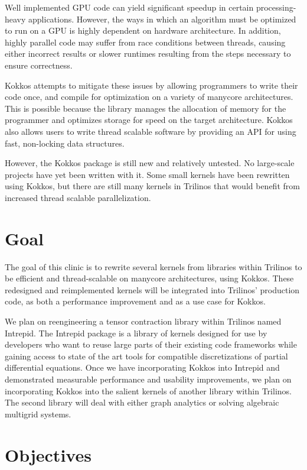 \documentclass[proposal]{hmcclinic}
\begin{document}
Well implemented GPU code can yield significant speedup in certain
processing-heavy applications.  However, the ways in which an algorithm must be optimized 
to run on a GPU is highly dependent on hardware architecture.  In
addition, highly parallel code may suffer from race conditions between threads,
causing either incorrect results or slower runtimes resulting from the steps
necessary to ensure correctness.

Kokkos attempts to mitigate these issues by allowing programmers to
write their code once, and compile for optimization on a variety of
manycore architectures.  This is possible because the library manages the
allocation of memory for the programmer and optimizes storage for speed on
the target architecture. Kokkos also allows users to write thread scalable
software by providing an API for using fast, non-locking data structures. 

However, the Kokkos package is still new and relatively untested.  No
large-scale projects have yet been written with it.  Some small kernels
have been rewritten using Kokkos, but there are still many kernels in Trilinos
that would benefit from increased thread scalable parallelization. 


\section{Goal}

The goal of this clinic is to rewrite several kernels from libraries within Trilinos to be efficient
and thread-scalable on manycore architectures, using Kokkos.  These redesigned
and reimplemented kernels will be integrated into Trilinos' production code, as
both a performance improvement and as a use case for Kokkos.

We plan on reengineering a tensor contraction library within Trilinos named Intrepid. The 
Intrepid package is a library of kernels designed for use by developers who want to 
reuse large parts of their existing code frameworks while gaining access to state of the
art tools for compatible discretizations of partial differential equations. Once we have incorporating 
Kokkos into Intrepid and demonstrated measurable performance and usability 
improvements, we plan on incorporating Kokkos into the salient kernels of another library 
within Trilinos.  The second library will deal with either graph analytics or solving algebraic multigrid systems.
\section{Objectives}
\end{document}
